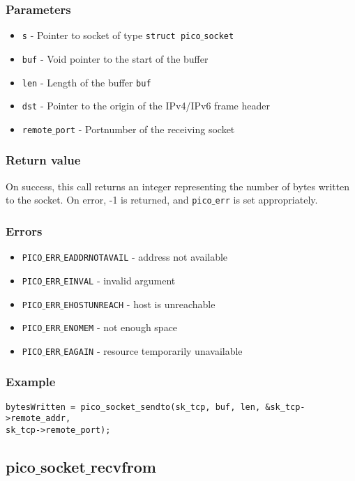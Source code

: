 \subsubsection*{Parameters}
\begin{itemize}[noitemsep]
\item \texttt{s} - Pointer to socket of type \texttt{struct pico$\_$socket}
\item \texttt{buf} - Void pointer to the start of the buffer
\item \texttt{len} - Length of the buffer \texttt{buf}
\item \texttt{dst} - Pointer to the origin of the IPv4/IPv6 frame header
\item \texttt{remote$\_$port} - Portnumber of the receiving socket
\end{itemize}

\subsubsection*{Return value}
On success, this call returns an integer representing the number of bytes written to the socket.
On error, -1 is returned, and \texttt{pico$\_$err} is set appropriately.

\subsubsection*{Errors}
\begin{itemize}[noitemsep]
\item \texttt{PICO$\_$ERR$\_$EADDRNOTAVAIL} - address not available
\item \texttt{PICO$\_$ERR$\_$EINVAL} - invalid argument
\item \texttt{PICO$\_$ERR$\_$EHOSTUNREACH} - host is unreachable
\item \texttt{PICO$\_$ERR$\_$ENOMEM} - not enough space
\item \texttt{PICO$\_$ERR$\_$EAGAIN} - resource temporarily unavailable
\end{itemize}

\subsubsection*{Example}
\begin{verbatim}
bytesWritten = pico_socket_sendto(sk_tcp, buf, len, &sk_tcp->remote_addr,
sk_tcp->remote_port);
\end{verbatim}


\subsection{pico$\_$socket$\_$recvfrom}

